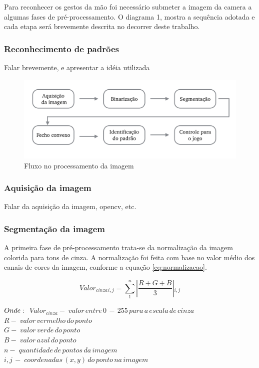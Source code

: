 \documentclass[12pt]{article}
\begin{document}
Para reconhecer os gestos da mão foi necessário submeter a imagem da camera a algumas fases de pré-processamento. O diagrama 1, mostra a sequência adotada e cada etapa será brevemente descrita no decorrer deste trabalho.  

\subsubsection{Reconhecimento de padrões}
Falar brevemente, e apresentar a idéia utilizada

\begin{figure}[ht]
\centering
\includegraphics[width=.7\textwidth]{fluxo.png}
\caption{Fluxo no processamento da imagem} \label{fig1}
\end{figure}
\subsubsection{Aquisição da imagem}
Falar da aquisição da imagem, opencv, etc.

\subsubsection{Segmentação da imagem}

A primeira fase de pré-processamento trata-se da normalização da imagem colorida para tons de cinza. A normalização foi feita com base no valor médio dos canais de cores da imagem, conforme a equação \ref{eq:normalizacao}.



\begin{equation} \label{eq:normalizacao}
Valor{_{cinza}}{_{i, j}}= \sum_{1}^{n} \left |\frac{R + G + B}{3}\right |{_{i, j}}
\end{equation}

$Onde:\\$
$Valor{_{cinza}} -\; valor\,entre\,0\,-\,255\,para\,a\,escala\,de\,cinza$\\
$R -\; valor\,vermelho\,do\,ponto$\\
$G -\; valor\,verde\,do\,ponto$\\
$B -\; valor\,azul\,do\,ponto$\\
$n -\; quantidade\,de\,pontos\,da\,imagem$\\
$i, j \,-\;coordenadas\, (x,y)\, do\, ponto\, na\, imagem$\\
\end{document}

